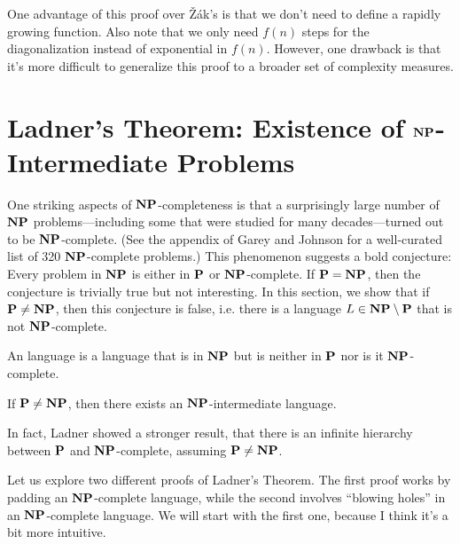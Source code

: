 \documentclass[11pt,twoside=off,numbers=noenddot]{scrbook}
\begin{document}
\begin{remark}
  One advantage of this proof over Žák's is that we don't need to define a rapidly growing function. Also note that we only need $f(n)$ steps for the diagonalization instead of exponential in $f(n)$. However, one drawback is that it's more difficult to generalize this proof to a broader set of complexity measures.
\end{remark}

\section{Ladner's Theorem: Existence of $\textbf{NP}$-Intermediate Problems}
One striking aspects of $\textbf{NP}$-completeness is that a surprisingly large number of $\textbf{NP}$ problems—including some that were studied for many decades—turned out to be $\textbf{NP}$-complete. (See the appendix of Garey and Johnson \cite{garey1979computers} for a well-curated list of 320 $\textbf{NP}$-complete problems.) This phenomenon suggests a bold conjecture: Every problem in $\textbf{NP}$ is either in $\textbf{P}$ or $\textbf{NP}$-complete. If $\textbf{P} = \textbf{NP}$, then the conjecture is trivially true but not interesting. In this section, we show that if $\textbf{P} \neq \textbf{NP}$, then this conjecture is false, i.e. there is a language $L \in \textbf{NP} \setminus \textbf{P}$ that is not $\textbf{NP}$-complete.

\begin{definition}
  An  language is a language that is in $\textbf{NP}$ but is neither in $\textbf{P}$ nor is it $\textbf{NP}$-complete.
\end{definition}

\begin{theorem}
  If $\textbf{P} \neq \textbf{NP}$, then there exists an $\textbf{NP}$-intermediate language.
\end{theorem}

\begin{remark}
  In fact, Ladner \cite{ladner1975structure} showed a stronger result, that there is an infinite hierarchy between $\textbf{P}$ and $\textbf{NP}$-complete, assuming $\textbf{P} \neq \textbf{NP}$.
\end{remark}

Let us explore two different proofs of Ladner's Theorem. The first proof works by padding an $\textbf{NP}$-complete language, while the second involves ``blowing holes'' in an $\textbf{NP}$-complete language. We will start with the first one, because I think it's a bit more intuitive.
\end{document}
